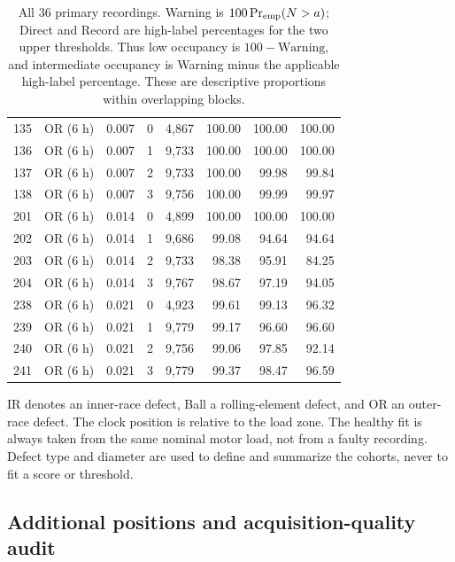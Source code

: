 \documentclass[11pt]{article}
\theoremstyle{definition}
\theoremstyle{remark}
\newcommand{\1}{\mathbf 1}
\begin{document}
\begin{table}[H]
\begin{tabular}{rlrrrrrr}
135 & OR (6 h) & 0.007 & 0 & 4,867 & 100.00 & 100.00 & 100.00 \\
136 & OR (6 h) & 0.007 & 1 & 9,733 & 100.00 & 100.00 & 100.00 \\
137 & OR (6 h) & 0.007 & 2 & 9,733 & 100.00 & 99.98 & 99.84 \\
138 & OR (6 h) & 0.007 & 3 & 9,756 & 100.00 & 99.99 & 99.97 \\
201 & OR (6 h) & 0.014 & 0 & 4,899 & 100.00 & 100.00 & 100.00 \\
202 & OR (6 h) & 0.014 & 1 & 9,686 & 99.08 & 94.64 & 94.64 \\
203 & OR (6 h) & 0.014 & 2 & 9,733 & 98.38 & 95.91 & 84.25 \\
204 & OR (6 h) & 0.014 & 3 & 9,767 & 98.67 & 97.19 & 94.05 \\
238 & OR (6 h) & 0.021 & 0 & 4,923 & 99.61 & 99.13 & 96.32 \\
239 & OR (6 h) & 0.021 & 1 & 9,779 & 99.17 & 96.60 & 96.60 \\
240 & OR (6 h) & 0.021 & 2 & 9,756 & 99.06 & 97.85 & 92.14 \\
241 & OR (6 h) & 0.021 & 3 & 9,779 & 99.37 & 98.47 & 96.59 \\
\bottomrule
\end{tabular}
\caption{All \(36\) primary recordings. Warning is \(100\Pr_{\rm emp}(N>a)\); Direct and Record are high-label percentages for the two upper thresholds. Thus low occupancy is \(100-\text{Warning}\), and intermediate occupancy is Warning minus the applicable high-label percentage. These are descriptive proportions within overlapping blocks.}
\label{tab:cwru_all_primary}
\end{table}

IR denotes an inner-race defect, Ball a rolling-element defect, and OR an outer-race defect. The clock position is relative to the load zone. The healthy fit is always taken from the same nominal motor load, not from a faulty recording. Defect type and diameter are used to define and summarize the cohorts, never to fit a score or threshold.

\clearpage
\subsection{Additional positions and acquisition-quality audit}
\end{document}

